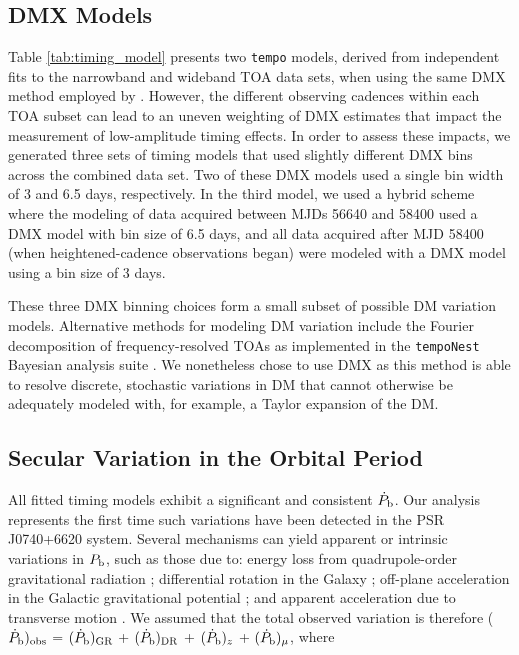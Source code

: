\documentclass[twocolumn]{aastex63}
\newcommand{\pbdot}{$\dot{P}_{\rm b}$}
\newcommand{\pbdottotal}{($\dot{P}_{\rm b})_{\rm obs}$ = $(\dot{P}_{\rm b})_{\rm GR}$ + $(\dot{P}_{\rm b})_{\rm DR}$ + $(\dot{P}_{\rm b})_z$ + $(\dot{P}_{\rm b})_\mu$}
\newcommand{\tempo}{{\tt tempo}}
\begin{document}
\subsection{DMX Models}
\label{subsec:dmxmodels}

Table \ref{tab:timing_model} presents two \tempo{} models, derived from independent fits to the narrowband and wideband TOA data sets, when using the same DMX method employed by \citet{cfr+20}. However, the different observing cadences within each TOA subset can lead to an uneven weighting of DMX estimates that impact the measurement of low-amplitude timing effects. In order to assess these impacts, we generated three sets of timing models that used slightly different DMX bins across the combined data set. Two of these DMX models used a single bin width of 3 and 6.5 days, respectively. In the third model, we used a hybrid scheme where the modeling of data acquired between MJDs 56640 and 58400 used a DMX model with bin size of 6.5 days, and all data acquired after MJD 58400 (when heightened-cadence observations began) were modeled with a DMX model using a bin size of 3 days.

These three DMX binning choices form a small subset of possible DM variation models. Alternative methods for modeling DM variation include the Fourier decomposition of frequency-resolved TOAs as implemented in the {\tt tempoNest} Bayesian analysis suite \citep{lah+14}. We nonetheless chose to use DMX as this method is able to resolve discrete, stochastic variations in DM that cannot otherwise be adequately modeled with, for example, a Taylor expansion of the DM. 

\subsection{Secular Variation in the Orbital Period}
\label{subsec:analysis_pbdot}
All fitted timing models exhibit a significant and consistent \pbdot. Our analysis represents the first time such variations have been detected in the PSR J0740+6620 system. Several mechanisms can yield apparent or intrinsic variations in $P_{\rm b}$, such as those due to: energy loss from quadrupole-order gravitational radiation \citep[(\pbdot)$_{\rm GR}$; e.g.,][]{dt92}; differential rotation in the Galaxy \citep[(\pbdot)$_\textrm{DR}$; e.g.,][]{nt95}; off-plane acceleration in the Galactic gravitational potential \citep[(\pbdot)$_z$;][]{kg89}; and apparent acceleration due to transverse motion \citep[(\pbdot)$_\mu$;][]{shk70}. We assumed that the total observed variation is therefore \pbdottotal, where 
\end{document}
